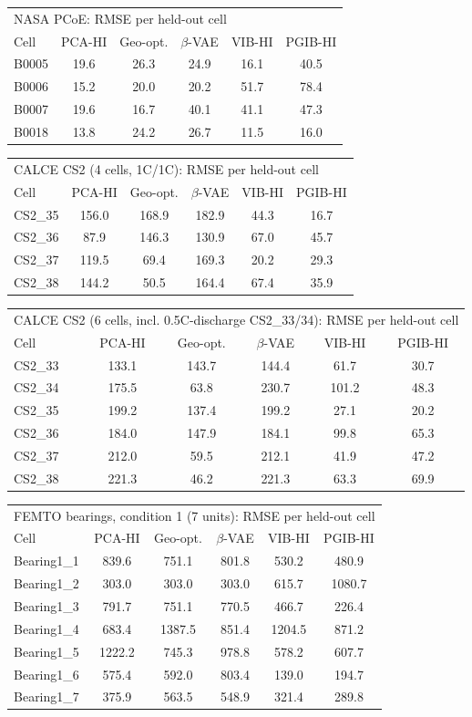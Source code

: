 \begin{tabular}{l c c c c c}
\hline
\multicolumn{6}{l}{NASA PCoE: RMSE per held-out cell}\\
 Cell & PCA-HI & Geo-opt. & $\beta$-VAE & VIB-HI & PGIB-HI \\
\hline
B0005 & 19.6 & 26.3 & 24.9 & 16.1 & 40.5 \\
B0006 & 15.2 & 20.0 & 20.2 & 51.7 & 78.4 \\
B0007 & 19.6 & 16.7 & 40.1 & 41.1 & 47.3 \\
B0018 & 13.8 & 24.2 & 26.7 & 11.5 & 16.0 \\
\hline
\end{tabular}
\begin{tabular}{l c c c c c}
\hline
\multicolumn{6}{l}{CALCE CS2 (4 cells, 1C/1C): RMSE per held-out cell}\\
 Cell & PCA-HI & Geo-opt. & $\beta$-VAE & VIB-HI & PGIB-HI \\
\hline
CS2\_35 & 156.0 & 168.9 & 182.9 & 44.3 & 16.7 \\
CS2\_36 & 87.9 & 146.3 & 130.9 & 67.0 & 45.7 \\
CS2\_37 & 119.5 & 69.4 & 169.3 & 20.2 & 29.3 \\
CS2\_38 & 144.2 & 50.5 & 164.4 & 67.4 & 35.9 \\
\hline
\end{tabular}
\begin{tabular}{l c c c c c}
\hline
\multicolumn{6}{l}{CALCE CS2 (6 cells, incl. 0.5C-discharge CS2\_33/34): RMSE per held-out cell}\\
 Cell & PCA-HI & Geo-opt. & $\beta$-VAE & VIB-HI & PGIB-HI \\
\hline
CS2\_33 & 133.1 & 143.7 & 144.4 & 61.7 & 30.7 \\
CS2\_34 & 175.5 & 63.8 & 230.7 & 101.2 & 48.3 \\
CS2\_35 & 199.2 & 137.4 & 199.2 & 27.1 & 20.2 \\
CS2\_36 & 184.0 & 147.9 & 184.1 & 99.8 & 65.3 \\
CS2\_37 & 212.0 & 59.5 & 212.1 & 41.9 & 47.2 \\
CS2\_38 & 221.3 & 46.2 & 221.3 & 63.3 & 69.9 \\
\hline
\end{tabular}
\begin{tabular}{l c c c c c}
\hline
\multicolumn{6}{l}{FEMTO bearings, condition 1 (7 units): RMSE per held-out cell}\\
 Cell & PCA-HI & Geo-opt. & $\beta$-VAE & VIB-HI & PGIB-HI \\
\hline
Bearing1\_1 & 839.6 & 751.1 & 801.8 & 530.2 & 480.9 \\
Bearing1\_2 & 303.0 & 303.0 & 303.0 & 615.7 & 1080.7 \\
Bearing1\_3 & 791.7 & 751.1 & 770.5 & 466.7 & 226.4 \\
Bearing1\_4 & 683.4 & 1387.5 & 851.4 & 1204.5 & 871.2 \\
Bearing1\_5 & 1222.2 & 745.3 & 978.8 & 578.2 & 607.7 \\
Bearing1\_6 & 575.4 & 592.0 & 803.4 & 139.0 & 194.7 \\
Bearing1\_7 & 375.9 & 563.5 & 548.9 & 321.4 & 289.8 \\
\hline
\end{tabular}
